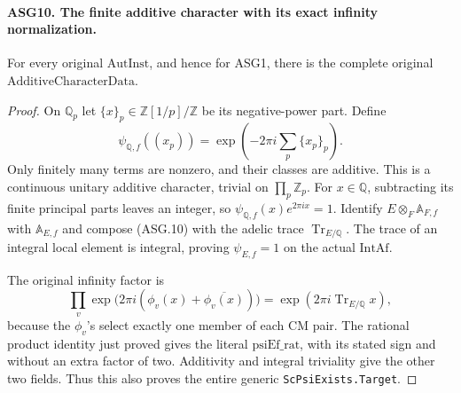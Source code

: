 \documentclass[11pt,a4paper]{article}
\numberwithin{equation}{section}
\theoremstyle{remark}\newtheorem{remark}[theorem]{Remark}
\begin{document}
\paragraph{ASG10. The finite additive character with its exact infinity normalization.}
\label{claim:ASG10}
For every original \(\mathrm{AutInst}\), and hence for ASG1,
there is the complete original \(\mathrm{AdditiveCharacterData}\).
\begin{proof}
On \(\mathbb Q_p\) let \(\{x\}_p\in\mathbb Z[1/p]/\mathbb Z\)
be its negative-power part.  Define
\[
 \psi_{\mathbb Q,f}((x_p))
       =\exp\!\left(-2\pi i\sum_p\{x_p\}_p\right).
\tag{ASG.10}
\]
Only finitely many terms are nonzero, and their classes are additive.
This is a continuous unitary additive character, trivial on
\(\prod_p\mathbb Z_p\).  For \(x\in\mathbb Q\), subtracting
its finite principal parts leaves an integer, so
\(\psi_{\mathbb Q,f}(x)e^{2\pi ix}=1\).
Identify \(E\otimes_F\mathbb A_{F,f}\) with
\(\mathbb A_{E,f}\) and compose (ASG.10) with the adelic trace
\(\operatorname{Tr}_{E/\mathbb Q}\).
The trace of an integral local element is integral, proving
\(\psi_{E,f}=1\) on the actual \(\mathrm{IntAf}\).

The original infinity factor is
\[
 \prod_v \exp\bigl(2\pi i(\phi_v(x)+\overline{\phi_v(x)})\bigr)
               =\exp(2\pi i\operatorname{Tr}_{E/\mathbb Q}x),
\]
because the \(\phi_v\)'s select exactly one member of each CM
pair.  The rational product identity just proved gives the literal
\(\mathrm{psiEf\_\allowbreak rat}\), with its stated sign and without an
extra factor of two.  Additivity and integral triviality give the other
two fields.  Thus this also proves the entire generic
\texttt{Sc\allowbreak Psi\allowbreak Exists.\allowbreak Target}.
\end{proof}

\end{document}
